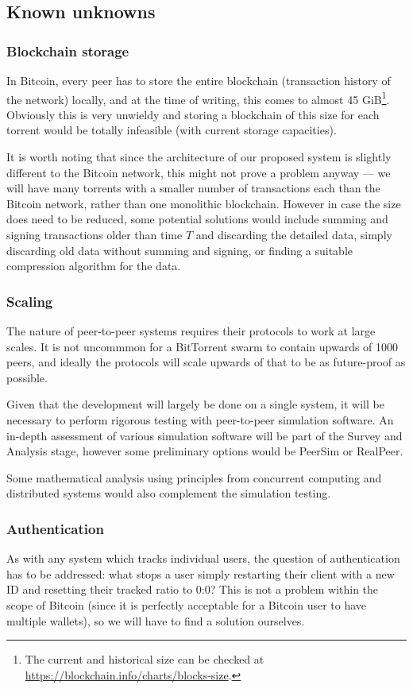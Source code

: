 \documentclass{article}
\begin{document}
\subsection{Known unknowns}

\subsubsection{Blockchain storage}
In Bitcoin, every peer has to store the entire blockchain (transaction history of the network) locally, and at the time of writing, this comes to almost 45 GiB\footnote{The current and historical size can be checked at \url{https://blockchain.info/charts/blocks-size}.}.  Obviously this is very unwieldy and storing a blockchain of this size for each torrent would be totally infeasible (with current storage capacities).

It is worth noting that since the architecture of our proposed system is slightly different to the Bitcoin network, this might not prove a problem anyway --- we will have many torrents with a smaller number of transactions each than the Bitcoin network, rather than one monolithic blockchain.  However in case the size does need to be reduced, some potential solutions would include summing and signing transactions older than time $T$ and discarding the detailed data, simply discarding old data without summing and signing, or finding a suitable compression algorithm for the data.

\subsubsection{Scaling}
The nature of peer-to-peer systems requires their protocols to work at large scales.  It is not uncommmon for a BitTorrent swarm to contain upwards of 1000 peers, and ideally the protocols will scale upwards of that to be as future-proof as possible.

Given that the development will largely be done on a single system, it will be necessary to perform rigorous testing with peer-to-peer simulation software.  An in-depth assessment of various simulation software will be part of the Survey and Analysis stage, however some preliminary options would be PeerSim or RealPeer.

Some mathematical analysis using principles from concurrent computing and distributed systems would also complement the simulation testing.

\subsubsection{Authentication}
As with any system which tracks individual users, the question of authentication has to be addressed: what stops a user simply restarting their client with a new ID and resetting their tracked ratio to 0:0?  This is not a problem within the scope of Bitcoin (since it is perfectly acceptable for a Bitcoin user to have multiple wallets), so we will have to find a solution ourselves.
\end{document}
